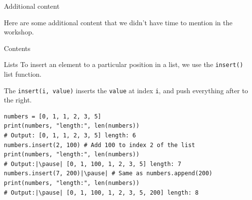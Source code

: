 \documentclass[dvipsnames, svgnames, x11names, handout]{beamer}
\begin{document}
\setcounter{framenumber}{0}











\begin{frame}{Additional content}
	\begin{center}
		Here are some additional content that we didn't have time to mention in the workshop.
	\end{center}
\end{frame}

\begin{frame}{Contents} 
\begin{center}
\end{center}
\end{frame}

\begin{frame}[fragile]{Lists}
To insert an element to a particular position in a list, we use the \texttt{insert()} list function.

The \texttt{insert(i, value)} inserts the \texttt{value} at index \texttt{i}, and push everything after to the right. \pause
\begin{verbatim}
numbers = [0, 1, 1, 2, 3, 5]
print(numbers, "length:", len(numbers)) 
# Output: [0, 1, 1, 2, 3, 5] length: 6
numbers.insert(2, 100) # Add 100 to index 2 of the list
print(numbers, "length:", len(numbers))  
# Output:|\pause| [0, 1, 100, 1, 2, 3, 5] length: 7
numbers.insert(7, 200)|\pause| # Same as numbers.append(200)
print(numbers, "length:", len(numbers))  
# Output:|\pause| [0, 1, 100, 1, 2, 3, 5, 200] length: 8
\end{verbatim}
\end{frame}
\end{document}
